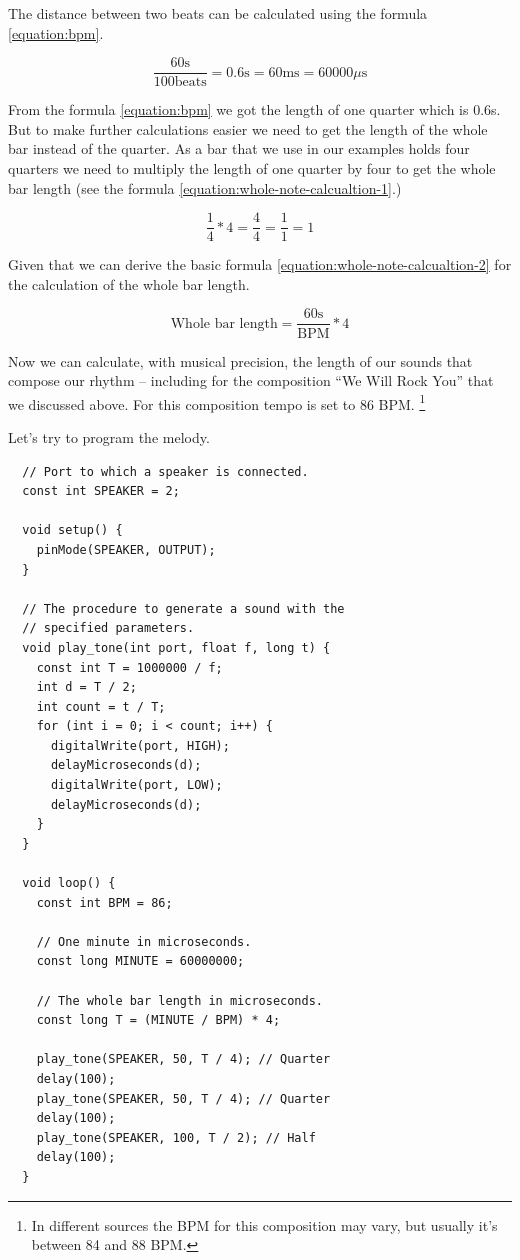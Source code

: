 \documentclass[../sparc.tex]{subfiles}
\begin{document}
The distance between two beats can be calculated using the formula
\ref{equation:bpm}.

\begin{equation}
  \frac{60 \mbox{s}}{100 \mbox{beats}} = 0.6 \mbox{s} = 60 \mbox{ms} = 60000 \mu\mbox{s}
  \label{equation:bpm}
\end{equation}

From the formula \ref{equation:bpm} we got the length of one quarter which is
0.6s.  But to make further calculations easier we need to get the length of the
whole bar instead of the quarter.  As a bar that we use in our examples holds
four quarters we need to multiply the length of one quarter by four to get the
whole bar length (see the formula \ref{equation:whole-note-calcualtion-1}.)

\begin{equation}
  \frac{1}{4} * 4 = \frac{4}{4} = \frac{1}{1} = 1
  \label{equation:whole-note-calcualtion-1}
\end{equation}

Given that we can derive the basic formula
\ref{equation:whole-note-calcualtion-2} for the calculation of the whole bar
length.

\begin{equation}
  \mbox{Whole bar length} = \frac{60 \mbox{s}}{\mbox{BPM}} * 4
  \label{equation:whole-note-calcualtion-2}
\end{equation}

Now we can calculate, with musical precision, the length of our sounds that
compose our rhythm -- including for the composition ``We Will Rock You'' that we
discussed above.  For this composition tempo is set to 86 BPM. \footnote{In
different sources the BPM for this composition may vary, but usually it's
between 84 and 88 BPM.}

Let's try to program the melody.

\begin{verbatim}
  // Port to which a speaker is connected.
  const int SPEAKER = 2;

  void setup() {
    pinMode(SPEAKER, OUTPUT);
  }

  // The procedure to generate a sound with the
  // specified parameters.
  void play_tone(int port, float f, long t) {
    const int T = 1000000 / f;
    int d = T / 2;
    int count = t / T;
    for (int i = 0; i < count; i++) {
      digitalWrite(port, HIGH);
      delayMicroseconds(d);
      digitalWrite(port, LOW);
      delayMicroseconds(d);
    }
  }

  void loop() {
    const int BPM = 86;

    // One minute in microseconds.
    const long MINUTE = 60000000;

    // The whole bar length in microseconds.
    const long T = (MINUTE / BPM) * 4;

    play_tone(SPEAKER, 50, T / 4); // Quarter
    delay(100);
    play_tone(SPEAKER, 50, T / 4); // Quarter
    delay(100);
    play_tone(SPEAKER, 100, T / 2); // Half
    delay(100);
  }
\end{verbatim}
\end{document}
